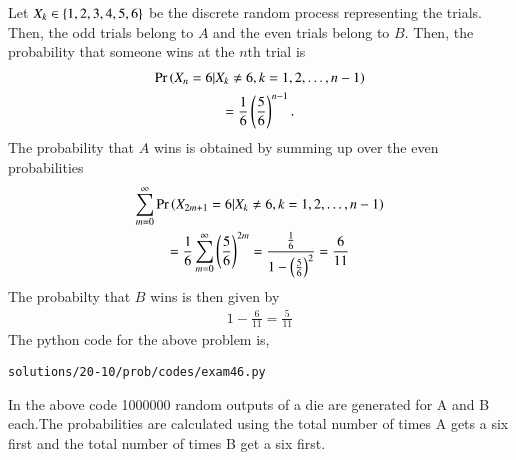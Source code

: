 Let $X_k \in \left\{1,2,3,4,5,6\right\}$ be the discrete random process representing the trials.  Then, the odd trials belong to $A$ and the even trials belong to $B$.
Then, the probability that someone  wins at the $n$th trial is
\begin{multline}
\Pr\left(X_{n} = 6|X_{k} \ne6, k = 1,2, \dots, n-1\right) 
\\
= \frac{1}{6}\left(\frac{5}{6}\right)^{n-1}.
\end{multline}
The probability that $A$ wins  is obtained by summing up over the even probabilities
\begin{multline}
\sum_{m = 0}^{\infty}\Pr\left(X_{2m+1} = 6|X_{k} \ne6, k = 1,2, \dots, n-1\right) 
\\
= \frac{1}{6}\sum_{m=0}^{\infty}\left(\frac{5}{6}\right)^{2m}
=\frac{\frac{1}{6}  }{1-\left(\frac{5}{6}\right)^2} = \frac{6}{11}
\end{multline}
The probabilty that $B$ wins is then given by
\begin{align}
 1 - \frac{6}{11} = \frac{5}{11}
\end{align}
The python code for the above problem is,
\begin{lstlisting}
solutions/20-10/prob/codes/exam46.py
\end{lstlisting}
In the above code 1000000 random outputs of a die are generated for A and B each.The probabilities are calculated using the total number of times A gets a six first and the total number of times B get a six first.
